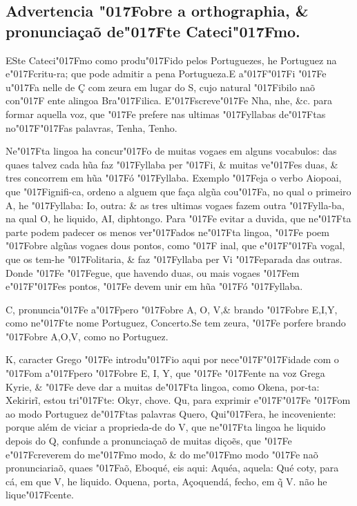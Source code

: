 \documentclass[openany,titlepage,12pt]{book}
\renewcommand{\chaptermark}[1]{\markboth{#1}{}}
\renewcommand{\sectionmark}[1]{\gdef\rightmark{#1}}
\newcommand{\lgS}{\char"017F}
\newcommand{\lgSS}{\char"017F\char"017F}
\begin{document}
\subsection{Advertencia \lgS obre a orthographia, \&
pronunciaçaõ de\lgS te Cateci\lgS mo.}


\lettrine[findent=2pt, nindent=0pt, lines=2]
{E}{S}te Cateci\lgS mo como produ\lgS ido pelos\linebreak
Portuguezes, he Portuguez na e\lgS critu-ra; que pode admitir
a pena Portugueza.\linebreak E a\lgSS i \lgS e u\lgS a nelle de
Ç com zeura em lugar do S, cujo natural \lgS ibilo naõ con\lgS
ente a\linebreak lingoa Bra\lgS ilica. E\lgS screve\lgS e Nha,
nhe, \&c. para formar aquella voz, que \lgS e prefere nas 
ultimas \lgS yllabas de\lgS tas no\lgSS as palavras,
Tenha, Tenho.

Ne\lgS ta lingoa ha concur\lgS o de muitas vogaes em alguns
vocabulos: das quaes talvez cada hũa faz \lgS yllaba per
\lgS i, \& muitas ve\lgS es duas, \& tres concorrem em hũa
\lgS ó \lgS yllaba. Exemplo \lgS eja o verbo Aiopoai, que
\lgS ignifi-ca, ordeno a alguem que faça algũa cou\lgS a,
no qual o primeiro A, he \lgS yllaba: Io, outra: \& as tres
ultimas vogaes fazem outra \lgS ylla-ba, na qual O, he liquido,
AI, diphtongo. Para \lgS e evitar a duvida, que ne\lgS ta
parte podem padecer os menos ver\lgS ados ne\lgS ta lingoa,
\lgS e poem \lgS obre algũas vogaes dous pontos, como \lgS 
inal, que e\lgSS a vogal, que os tem-he \lgS olitaria, \&
faz \lgS yllaba per Vi \lgS eparada das outras. Donde \lgS e
\lgS egue, que havendo duas, ou mais vogaes \lgS em
e\lgSS es pontos, \lgS e devem unir em hũa \lgS ó \lgS yllaba.

\chaptermark{Advertencia.}
\sectionmark{Advertencia.}

C, pronuncia\lgS e a\lgS pero \lgS obre A, O, V,\& brando
\lgS obre E,I,Y, como ne\lgS te nome Portuguez, 
Concerto.Se tem zeura, \lgS e porfere brando \lgS obre
A,O,V, como no Portuguez.

K, caracter Grego \lgS e introdu\lgS io aqui por
nece\lgSS idade com o \lgS om a\lgS pero \lgS obre E, I, Y, que
\lgS e \lgS ente na voz Grega Kyrie, \& \lgS e deve dar a muitas
de\lgS ta lingoa, como Okena, por-ta: Xekirirĩ, estou tri\lgS te:
Okyr, chove. Qu, para exprimir e\lgSS e \lgS om ao modo Portuguez
de\lgS tas palavras Quero, Qui\lgS era, he incoveniente: porque 
além de viciar a proprieda-de do V, que ne\lgS ta lingoa he liquido
depois do Q, confunde a pronunciaçaõ de muitas diçoẽs, que \lgS e
e\lgS creverem do me\lgS mo modo, \& do me\lgS mo modo \lgS e naõ
pronunciariaõ, quaes \lgS aõ, Eboqué, eis aqui: Aquéa, aquela: 
Qué coty, para cá, em que V, he liquido. Oquena, porta, Açoquendá,
fecho, em \~{q} V. não he lique\lgS cente.
\end{document}
